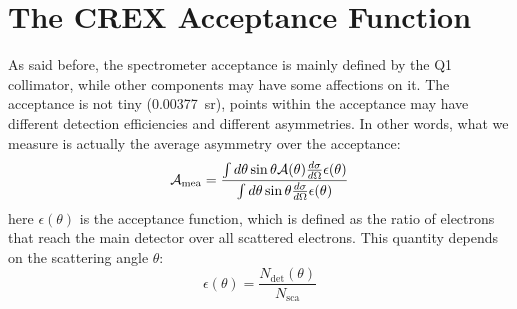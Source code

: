 \begin{comment}
\bigskip
One could also estimate the rate from measurement. 
\begin{eqaution}
    \sigma = \sqrt{\frac{1}{R/30}}
\end{eqaution}
\begin{table}[!h]
    \centering
    \begin{tabular}{c c c | c c c c c c}
	\hline
	Target	& run	& I $(\mu A)$   & \thead{rms \\ ($ppm$)} & \thead{rms@$70\ \mu A$ \\ ($ppm$)} & \thead{bcm res. \\ ($ppm$)}   & \thead{bpm res. \\ ($ppm$)}   & \thead{cor. rms \\ ($ppm$)}  & \thead{rate \\ ($GHz$)}  \\
	\hline
	C12	& 4133	& 86.2	& 143	& 158.7	& 20	& 25	& 150.4	& 1.326	\\
	D-Pb-D	& 4112	& 67.7	& 93	& 91.5	& 20	& 25	& 82.9	& 4.365	\\
	\hline
    \end{tabular}
    \caption{The corrected rms was calculated as: $\sqrt{\frac{\sigma^2 - \sigma^2_{bcm} - \sigma^2_{bpm}}{1 + 0.26^2}}$}
\end{table}
The C graphite target has a thickness of $1.991\ mm$ and a density of 
\end{comment}


\section{The CREX Acceptance Function}
As said before, the spectrometer acceptance is mainly defined by the Q1 
collimator, while other components may have some affections on it. The acceptance
is not tiny (0.00377~sr), points within the acceptance may have
different detection efficiencies and different asymmetries. In other words, 
what we measure is actually the average asymmetry over the acceptance:
\begin{equation}
    \mathcal{A}_{\text{mea}} = \frac{\int d\theta \sin\theta \mathcal{A}(\theta) \frac{d\sigma}{d\Omega} \epsilon(\theta)}{\int d\theta \sin\theta \frac{d\sigma}{d\Omega} \epsilon(\theta)}
    \label{eq:acceptance_function}
\end{equation}
here $\epsilon(\theta)$ is the acceptance function, which is defined as
the ratio of electrons that reach the main detector over all scattered
electrons. This quantity depends on the scattering angle $\theta$:
\begin{equation}
    \epsilon(\theta) = \frac{N_{\text{det}}(\theta)}{N_{\text{sca}}}
    \label{eq:acceptance_definition}
\end{equation}

